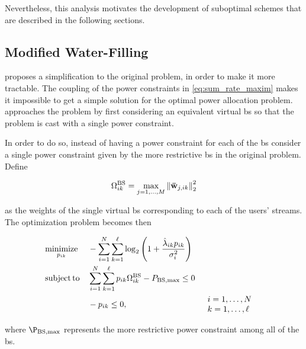 Nevertheless, this analysis motivates the development of suboptimal schemes that are described in the following sections.

\subsection{Modified Water-Filling}\label{ssec:modified_wf}

\cite{armada11b} proposes a simplification to the original problem, in order to
make it more tractable. The coupling of the power constraints in
\eqref{eq:sum_rate_maxim} makes it impossible to get a simple solution for the
optimal power allocation problem. \cite{armada11b} approaches the problem by
first considering an equivalent virtual \gls{bs} so that the problem is cast
with a single power constraint.

In order to do so, instead of having a power constraint for each of the \gls{bs}
consider a single power constraint given by the more restrictive \gls{bs} in the
original problem. Define

\begin{equation} \label{eq:equiv_bs}
    \Omega_{ik}^{\text{BS}} = \max\limits_{j=1, \ldots,M} \left\|\mathbf{\bar{w}}_{j,ik} \right\|_2^2
\end{equation}

\noindent
as the weights of the single virtual \gls{bs} corresponding to each of the
users' streams. The optimization problem becomes then

\begin{equation} \label{eq:optim_modif_wf}
\begin{aligned}
	&\operatorname*{minimize}\limits_{p_{ik}} &&-\sum\limits_{i = 1}^N
	\sum\limits_{k = 1}^\ell \log_2\left( 1 +
	\frac{\hat{\lambda}_{ik} p_{ik}}{\sigma_i^2} \right)\\
	&\operatorname*{subject\,to} &&\sum\limits_{i = 1}^N \sum\limits_{k = 1}^\ell p_{ik} \Omega_{ik}^{\text{BS}} -
    P_{\text{BS},\max} \leq 0\\
    & &&-p_{ik} \leq 0, &&
	\begin{array}{l}
	i = 1, \ldots, N\\
	k = 1, \ldots, \ell
	\end{array}
\end{aligned}
\end{equation}

\noindent
where $\P_{\text{BS}, \max}$ represents the more restrictive power constraint
among all of the \gls{bs}.

